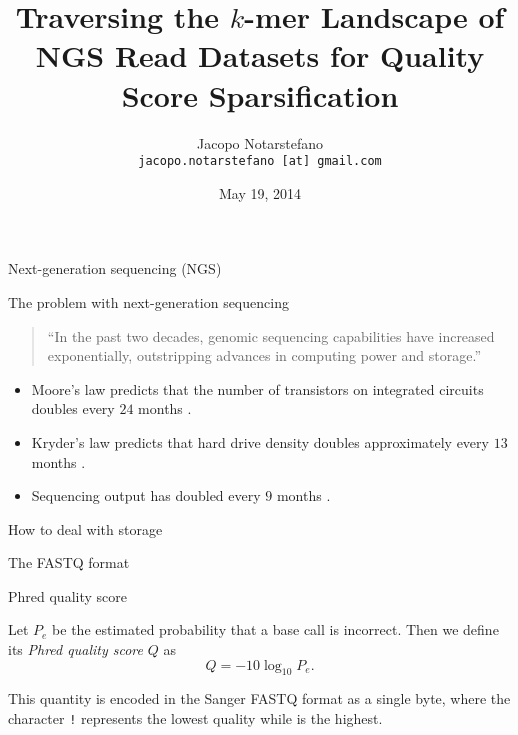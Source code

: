 \documentclass[12pt]{beamer}
\title[Traversing the \(k\)-mer Landscape of NGS Read Datasets]{
    Traversing the \(k\)-mer Landscape of NGS Read Datasets for Quality Score Sparsification
}
\author[Jacopo Notarstefano]{
    Jacopo Notarstefano\\
    \texttt{jacopo.notarstefano [at] gmail.com}
}
\date{May 19, 2014}
\newcommand{\textapprox}{\raisebox{0.5ex}{\texttildelow}}
\begin{document}
    \begin{frame}[plain]
        \titlepage
    \end{frame}

    \begin{frame}{Next-generation sequencing (NGS)}
    \end{frame}

    \begin{frame}{The problem with next-generation sequencing}
        \begin{quotation}
            ``In the past two decades, genomic sequencing capabilities have
            increased exponentially, outstripping advances in computing power
            and storage.''
        \end{quotation}
        \vspace{0.5cm}
        \begin{itemize}
            \item Moore's law predicts that the number of transistors on
                integrated circuits doubles every \(24\) months \cite{Moore1965}.
            \item Kryder's law predicts that hard drive density doubles
                approximately every \(13\) months \cite{Kryder2005}.
            \item Sequencing output has doubled every \(9\) months \cite{Kahn2011}.
        \end{itemize}
    \end{frame}

    \begin{frame}{How to deal with storage}
    \end{frame}

    \begin{frame}{The FASTQ format}
    \end{frame}

    \begin{frame}{Phred quality score}
        \begin{definition}
            Let \(P_e\) be the estimated probability that a base call is
            incorrect. Then we define its \emph{Phred quality score} \(Q\) as
            \[
                Q = -10\log_{10}{P_e}\text{.}
            \]
        \end{definition}
        \vspace{0.5cm}
        This quantity is encoded in the Sanger FASTQ format as a single byte,
        where the character \texttt{\textquotesingle!\textquotesingle}
        represents the lowest quality while
        \texttt{\textquotesingle\textapprox\textquotesingle} is the highest.
    \end{frame}
\end{document}
